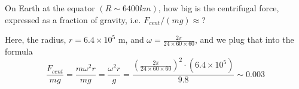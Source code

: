\documentclass[11pt]{article}
\begin{document}
\begin{example}
	On Earth at the equator \((R\sim 6400 km)\), how big is the centrifugal force, expressed as a fraction of gravity, i.e.  \(F_{cent}/(mg)\approx\)?
\end{example}
\begin{solution}
	Here, the radius, \(r = 6.4 \times 10^5\) m, and \(\omega = \frac{2\pi}{24 \times 60 \times 60}\), and we plug that into the formula \[\frac{F_{cent}}{mg} = \frac{m\omega^2 r}{mg} = \frac{\omega^2 r}{g} = \frac{\left(\frac{2\pi}{24 \times 60 \times 60}\right)^2 \cdot (6.4 \times 10^5)}{9.8} \sim 0.003\]
\end{solution}



\end{document}
